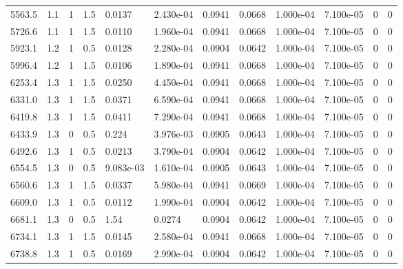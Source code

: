 \documentclass[preview]{standalone}
\begin{document}
{{\begin{tabular}{L{1.2cm}C{1.2cm} C{0.3cm}C{0.5cm} C{1.4cm}C{1.4cm} C{1.4cm}C{1.4cm} C{1.6cm}C{1.6cm} C{1.6cm}C{1.6cm}}
  5563.5  &   1.1  & 1     & 1.5 &  0.0137  & 2.430e-04  &  0.0941&   0.0668& 1.000e-04 & 7.100e-05   &  0 & 0  \\ 
  5726.6  &   1.1  & 1     & 1.5 &  0.0110  & 1.960e-04  &  0.0941&   0.0668& 1.000e-04 & 7.100e-05   &  0 & 0  \\ 
  5923.1  &   1.2  & 1     & 0.5 &  0.0128  & 2.280e-04  &  0.0904&   0.0642& 1.000e-04 & 7.100e-05   &  0 & 0  \\ 
  5996.4  &   1.2  & 1     & 1.5 &  0.0106  & 1.890e-04  &  0.0941&   0.0668& 1.000e-04 & 7.100e-05   &  0 & 0  \\ 
  6253.4  &   1.3  & 1     & 1.5 &  0.0250  & 4.450e-04  &  0.0941&   0.0668& 1.000e-04 & 7.100e-05   &  0 & 0  \\ 
  6331.0  &   1.3  & 1     & 1.5 &  0.0371  & 6.590e-04  &  0.0941&   0.0668& 1.000e-04 & 7.100e-05   &  0 & 0  \\ 
  6419.8  &   1.3  & 1     & 1.5 &  0.0411  & 7.290e-04  &  0.0941&   0.0668& 1.000e-04 & 7.100e-05   &  0 & 0  \\ 
  6433.9  &   1.3  & 0     & 0.5 &  0.224  & 3.976e-03  &  0.0905&   0.0643& 1.000e-04 & 7.100e-05   &  0 & 0  \\ 
  6492.6  &   1.3  & 1     & 0.5 &  0.0213  & 3.790e-04  &  0.0904&   0.0642& 1.000e-04 & 7.100e-05   &  0 & 0  \\ 
  6554.5  &   1.3  & 0     & 0.5 &  9.083e-03  & 1.610e-04  &  0.0905&   0.0643& 1.000e-04 & 7.100e-05   &  0 & 0  \\ 
  6560.6  &   1.3  & 1     & 1.5 &  0.0337  & 5.980e-04  &  0.0941&   0.0669& 1.000e-04 & 7.100e-05   &  0 & 0  \\ 
  6609.0  &   1.3  & 1     & 0.5 &  0.0112  & 1.990e-04  &  0.0904&   0.0642& 1.000e-04 & 7.100e-05   &  0 & 0  \\ 
  6681.1  &   1.3  & 0     & 0.5 &  1.54  & 0.0274  &  0.0904&   0.0642& 1.000e-04 & 7.100e-05   &  0 & 0  \\ 
  6734.1  &   1.3  & 1     & 1.5 &  0.0145  & 2.580e-04  &  0.0941&   0.0668& 1.000e-04 & 7.100e-05   &  0 & 0  \\ 
  6738.8  &   1.3  & 1     & 0.5 &  0.0169  & 2.990e-04  &  0.0904&   0.0642& 1.000e-04 & 7.100e-05   &  0 & 0  \\ 
\hline 
\end{tabular} 

}}
\end{document}

